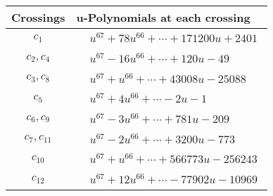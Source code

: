 \documentclass[1p]{elsarticle_modified}
\theoremstyle{definition}
\begin{document}
\begin{tabular}{m{50pt}|m{274pt}}
Crossings & \hspace{64pt}u-Polynomials at each crossing \\
\hline $$\begin{aligned}c_{1}\end{aligned}$$&$\begin{aligned}
&u^{67}+78 u^{66}+\cdots+171200 u+2401
\end{aligned}$\\
\hline $$\begin{aligned}c_{2},c_{4}\end{aligned}$$&$\begin{aligned}
&u^{67}-16 u^{66}+\cdots+120 u-49
\end{aligned}$\\
\hline $$\begin{aligned}c_{3},c_{8}\end{aligned}$$&$\begin{aligned}
&u^{67}+u^{66}+\cdots+43008 u-25088
\end{aligned}$\\
\hline $$\begin{aligned}c_{5}\end{aligned}$$&$\begin{aligned}
&u^{67}+4 u^{66}+\cdots-2 u-1
\end{aligned}$\\
\hline $$\begin{aligned}c_{6},c_{9}\end{aligned}$$&$\begin{aligned}
&u^{67}-3 u^{66}+\cdots+781 u-209
\end{aligned}$\\
\hline $$\begin{aligned}c_{7},c_{11}\end{aligned}$$&$\begin{aligned}
&u^{67}-2 u^{66}+\cdots+3200 u-773
\end{aligned}$\\
\hline $$\begin{aligned}c_{10}\end{aligned}$$&$\begin{aligned}
&u^{67}+u^{66}+\cdots+566773 u-256243
\end{aligned}$\\
\hline $$\begin{aligned}c_{12}\end{aligned}$$&$\begin{aligned}
&u^{67}+12 u^{66}+\cdots-77902 u-10969
\end{aligned}$\\
\hline
\end{tabular}\\~\\
\end{document}
